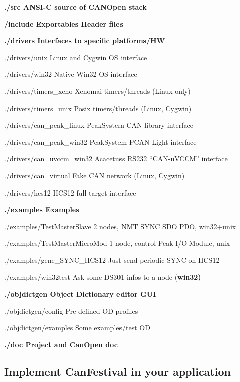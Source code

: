 \documentclass[a4paper,12pt]{book}
\begin{document}
{\ttfamily\bfseries
./src ANSI{}-C source of CANOpen stack}

{\ttfamily\bfseries
\space /include Exportables Header files}

{\ttfamily\bfseries
./drivers Interfaces to specific platforms/HW}

{\ttfamily
./drivers/unix Linux and Cygwin OS interface}

{\ttfamily
./drivers/win32 Native Win32 OS interface}

{\ttfamily
./drivers/timers\_xeno Xenomai timers/threads (Linux only)}

{\ttfamily
./drivers/timers\_unix Posix timers/threads (Linux, Cygwin)}

{\ttfamily
./drivers/can\_peak\_linux PeakSystem CAN library interface}

{\ttfamily
./drivers/can\_peak\_win32 PeakSystem PCAN{}-Light interface}

{\ttfamily
./drivers/can\_uvccm\_win32 Acacetus{\textquotesingle}s RS232
``CAN{}-uVCCM'' interface}

{\ttfamily
./drivers/can\_virtual Fake CAN network (Linux, Cygwin)}

{\ttfamily
./drivers/hcs12 HCS12 full target interface}

{\ttfamily\bfseries
./examples Examples}

{\ttfamily
./examples/TestMasterSlave 2 nodes, NMT SYNC SDO PDO, win32+unix}

{\ttfamily
./examples/TestMasterMicroMod 1 node, control Peak I/O Module, unix}

{\ttfamily
./examples/gene\_SYNC\_HCS12 Just send periodic SYNC on HCS12}

{\ttfamily
./examples/win32test Ask some DS301 infos to a node (\textbf{win32)}}

{\ttfamily\bfseries
./objdictgen Object Dictionary editor GUI}

{\ttfamily
./objdictgen/config Pre{}-defined OD profiles}

{\ttfamily
./objdictgen/examples Some examples/test OD}

{\ttfamily\bfseries
./doc Project and CanOpen doc}

\subsection{Implement CanFestival in your application}
 
\end{document}
